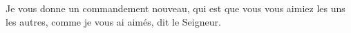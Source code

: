 Je vous donne un commandement nouveau, qui est que vous vous aimiez les uns les autres, comme je vous ai aimés, dit le Seigneur.
